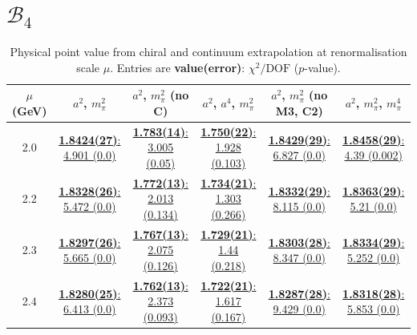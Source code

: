 \documentclass[12pt]{extarticle}
\begin{document}
\section{$\mathcal{B}_4$}
\begin{table}[h!]
\begin{center}
\begin{tabular}{|c|c|c|c|c|c|}
\hline
$\mu$ (GeV) & $a^2$, $m_\pi^2$& $a^2$, $m_\pi^2$ (no C)& $a^2$, $a^4$, $m_\pi^2$& $a^2$, $m_\pi^2$ (no M3, C2)& $a^2$, $m_\pi^2$, $m_\pi^4$\\
\hline
2.0& \hyperlink{SSpPP/SUSY/a2m2_20.pdf.1}{\textbf{1.8424(27)}: 4.901 (0.0)} & \hyperlink{SSpPP/SUSY/a2m2noC_20.pdf.1}{\textbf{1.783(14)}: 3.005 (0.05)} & \hyperlink{SSpPP/SUSY/a2a4m2_20.pdf.1}{\textbf{1.750(22)}: 1.928 (0.103)} & \hyperlink{SSpPP/SUSY/a2m2mcut_20.pdf.1}{\textbf{1.8429(29)}: 6.827 (0.0)} & \hyperlink{SSpPP/SUSY/a2m2m4_20.pdf.1}{\textbf{1.8458(29)}: 4.39 (0.002)}\\
2.2& \hyperlink{SSpPP/SUSY/a2m2_22.pdf.1}{\textbf{1.8328(26)}: 5.472 (0.0)} & \hyperlink{SSpPP/SUSY/a2m2noC_22.pdf.1}{\textbf{1.772(13)}: 2.013 (0.134)} & \hyperlink{SSpPP/SUSY/a2a4m2_22.pdf.1}{\textbf{1.734(21)}: 1.303 (0.266)} & \hyperlink{SSpPP/SUSY/a2m2mcut_22.pdf.1}{\textbf{1.8332(29)}: 8.115 (0.0)} & \hyperlink{SSpPP/SUSY/a2m2m4_22.pdf.1}{\textbf{1.8363(29)}: 5.21 (0.0)}\\
2.3& \hyperlink{SSpPP/SUSY/a2m2_23.pdf.1}{\textbf{1.8297(26)}: 5.665 (0.0)} & \hyperlink{SSpPP/SUSY/a2m2noC_23.pdf.1}{\textbf{1.767(13)}: 2.075 (0.126)} & \hyperlink{SSpPP/SUSY/a2a4m2_23.pdf.1}{\textbf{1.729(21)}: 1.44 (0.218)} & \hyperlink{SSpPP/SUSY/a2m2mcut_23.pdf.1}{\textbf{1.8303(28)}: 8.347 (0.0)} & \hyperlink{SSpPP/SUSY/a2m2m4_23.pdf.1}{\textbf{1.8334(29)}: 5.252 (0.0)}\\
2.4& \hyperlink{SSpPP/SUSY/a2m2_24.pdf.1}{\textbf{1.8280(25)}: 6.413 (0.0)} & \hyperlink{SSpPP/SUSY/a2m2noC_24.pdf.1}{\textbf{1.762(13)}: 2.373 (0.093)} & \hyperlink{SSpPP/SUSY/a2a4m2_24.pdf.1}{\textbf{1.722(21)}: 1.617 (0.167)} & \hyperlink{SSpPP/SUSY/a2m2mcut_24.pdf.1}{\textbf{1.8287(28)}: 9.429 (0.0)} & \hyperlink{SSpPP/SUSY/a2m2m4_24.pdf.1}{\textbf{1.8318(28)}: 5.853 (0.0)}\\
\hline
\end{tabular}
\caption{Physical point value from chiral and continuum extrapolation at renormalisation scale $\mu$. Entries are \textbf{value(error)}: $\chi^2/\text{DOF}$ ($p$-value).}
\end{center}
\end{table}
\end{document}
